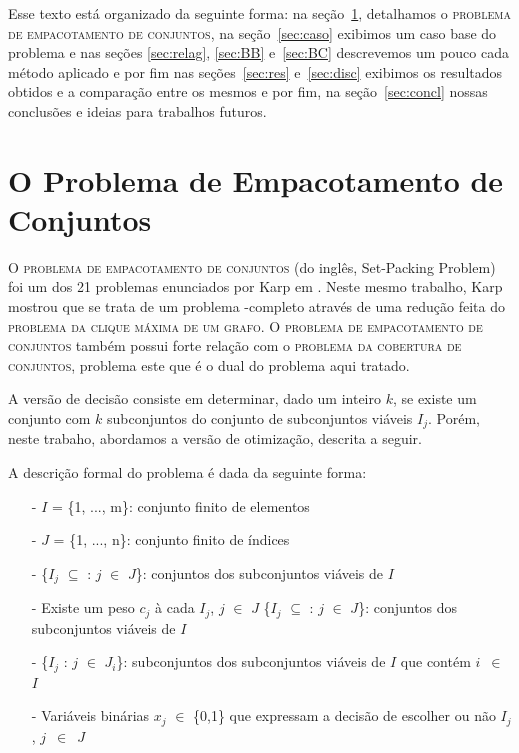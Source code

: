 \documentclass{article}
\begin{document}
	Esse texto está organizado da seguinte forma: na seção~\ref{sec:prob}, detalhamos o \textsc{problema de empacotamento de conjuntos}, na seção~\ref{sec:caso} exibimos um caso base do problema e nas seções \ref{sec:relag}, \ref{sec:BB} e~\ref{sec:BC} descrevemos um pouco cada método aplicado e por fim nas seções~\ref{sec:res} e~\ref{sec:disc} exibimos os resultados obtidos e a comparação entre os mesmos e por fim, na seção~\ref{sec:concl} nossas conclusões e ideias para trabalhos futuros.
	
	
	\section{O Problema de Empacotamento de Conjuntos}\label{sec:prob}
	O \textsc{problema de empacotamento de conjuntos} (do inglês, Set-Packing Problem) foi um dos 21 problemas enunciados por Karp em \cite{Karp}. Neste mesmo trabalho, Karp mostrou que se trata de um problema \NP-completo através de uma redução feita do \textsc{problema da clique máxima de um grafo}. O \textsc{problema de empacotamento de conjuntos} também possui forte relação com o \textsc{problema da cobertura de conjuntos}, problema este que é o dual do problema aqui tratado.
	
	A versão de decisão consiste em determinar, dado um inteiro $k$, se existe um conjunto com $k$ subconjuntos do conjunto de subconjuntos viáveis $I_j$. Porém, neste trabaho, abordamos a versão de otimização, descrita a seguir.
	
	A descrição formal do problema é dada da seguinte forma:
	
	\begin{itemize}
	    \item[-] $I$ = \{1, ..., m\}: conjunto finito de elementos
	    
	    \item[-] $J$ = \{1, ..., n\}: conjunto finito de índices
	    
	    \item[-] \{$I_j$ $\subseteq$ : $j$ $\in$ $J$\}: conjuntos dos subconjuntos viáveis de $I$
	    
	    \item[-] Existe um peso $c_j$ à cada $I_j$, $j$ $\in$ $J$
	    \{$I_j$ $\subseteq$ : $j$ $\in$ $J$\}: conjuntos dos subconjuntos viáveis de $I$
	    
	    \item[-] \{$I_j$ : $j$ $\in$ $J_i$\}: subconjuntos dos subconjuntos viáveis de $I$ que contém $i$~$\in$~$I$
	    \item[-] Variáveis binárias $x_j$ $\in$ \{0,1\} que expressam a decisão de escolher ou não $I_j$, $j$~$\in$~$J$
	\end{itemize}
	
\end{document}
